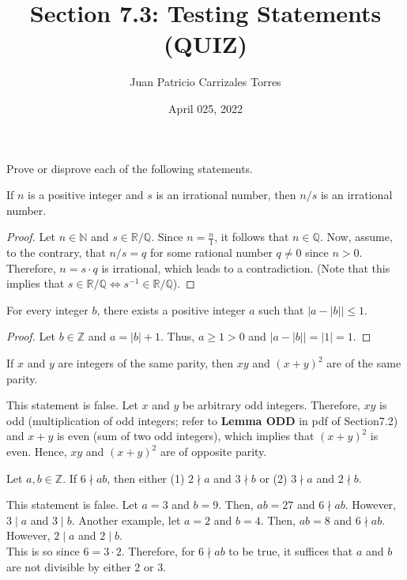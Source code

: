 \documentclass[12pt]{article}
\newcommand{\N}{\mathbb{N}}
\newcommand{\Z}{\mathbb{Z}}
\newcommand{\R}{\mathbb{R}}
\newcommand{\Q}{\mathbb{Q}}
\newenvironment{problem}[2][Problem]{\begin{trivlist}
		\item[\hskip \labelsep {\bfseries #1}\hskip \labelsep {\bfseries #2.}]}{\end{trivlist}}
\newenvironment{solution}[2][Solution]{\begin{trivlist}
		\item[\hskip \labelsep {\bfseries #1}\hskip \labelsep {\bfseries #2.}]}{\end{trivlist}}
\begin{document}
 
	
	\title{Section 7.3: Testing Statements (QUIZ)}
	\author{Juan Patricio Carrizales Torres}
	\date{April 025, 2022}
	\maketitle
	
	Prove or disprove each of the following statements.
	 
	\begin{problem}{1}
		If $n$ is a positive integer and $s$ is an irrational number, then $n/s$ is an irrational number.
		\begin{proof}
			Let $n\in \N$ and $s \in \R / \Q$. Since $n=\frac{n}{1}$, it follows that $n\in \Q$. Now, assume, to the contrary, that $n/s = q$ for some rational number $q\neq 0$ since $n>0$. Therefore, $n=s\cdot q$ is irrational, which leads to a contradiction. (Note that this implies that $s\in \R/\Q \iff s^{-1} \in \R/\Q$).
		\end{proof}
	\end{problem}
	
	\begin{problem}{2}
		For every integer $b$, there exists a positive integer $a$ such that $|a-|b||\leq 1$.
		\begin{proof}
			Let $b\in \Z$ and $a=|b|+1$. Thus, $a\geq 1>0$ and $|a-|b|| = |1|=1$.  
		\end{proof}
	\end{problem}

	\begin{problem}{3}
		If $x$ and $y$ are integers of the same parity, then $xy$ and $(x+y)^{2}$ are of the same parity.
		\begin{solution}{3}
			This statement is false. Let $x$ and $y$ be arbitrary odd integers. Therefore, $xy$ is odd (multiplication of odd integers; refer to \textbf{Lemma ODD} in pdf of Section7.2) and $x+y$ is even (sum of two odd integers), which implies that $(x+y)^{2}$ is even. Hence, $xy$ and $(x+y)^{2}$ are of opposite parity.
		\end{solution}
	\end{problem}
 
	\begin{problem}{4}
		Let $a,b\in \Z$. If $6\nmid ab$, then either (1) $2\nmid a$ and $3\nmid b$ or (2) $3\nmid a$ and $2\nmid b$. 
		\begin{solution}{4}
			This statement is false. Let $a=3$ and $b=9$. Then, $ab = 27$ and $6\nmid ab$. However, $3\mid a$ and $3\mid b$. Another example, let $a=2$ and $b=4$. Then, $ab=8$ and $6\nmid ab$. However, $2\mid a$ and $2\mid b$. \\
			
			This is so since $6=3\cdot 2$. Therefore, for $6\nmid ab$ to be true, it suffices that $a$ and $b$ are not divisible by either 2 or 3.
		\end{solution}
	\end{problem}
\end{document}
